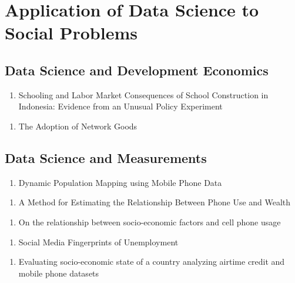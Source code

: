 \section{Application of Data Science to Social Problems}
\subsection{Data Science and Development Economics}

\begin{enumerate}
\item Schooling and Labor Market Consequences of School Construction in Indonesia: Evidence from an Unusual Policy Experiment  \cite{Duflo_2000}
\end{enumerate}

\begin{enumerate}
\item The Adoption of Network Goods  \cite{Bjorkegren}
\end{enumerate}

\subsection{Data Science and Measurements}
\begin{enumerate}
\item Dynamic Population Mapping using Mobile Phone Data\cite{Deville_2014}
\end{enumerate}
\begin{enumerate}
\item A Method for Estimating the Relationship Between Phone Use and Wealth
\end{enumerate}
\begin{enumerate}
\item On the relationship between socio-economic factors and cell phone usage \cite{Frias_Martinez_2012}
\end{enumerate}
\begin{enumerate}
\item Social Media Fingerprints of Unemployment 
\end{enumerate}
\begin{enumerate}
\item Evaluating socio-economic state of a country analyzing airtime credit and mobile phone datasets
\end{enumerate}

